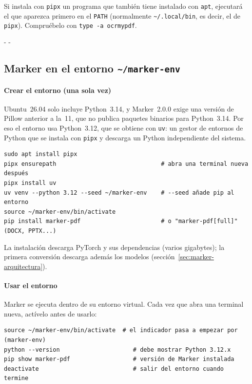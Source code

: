 \documentclass[11pt,a4paper]{article}
\makeatletter
\newcommand{\necesitaespacio}[1]{\par\penalty-100\begingroup
	\setlength{\dimen@}{#1}\dimen@ii\pagegoal\advance\dimen@ii-\pagetotal
	\ifdim\dimen@>\dimen@ii\ifdim\dimen@ii>\z@\vfil\fi\penalty-\@M\fi\endgroup}
\newcommand{\cmd}[1]{\texttt{\textcolor{colcmd}{#1}}}      %
\newcommand{\arch}[1]{\texttt{\textcolor{colarch}{#1}}}    %
\newcommand{\tl}{\textasciitilde{}}  %
\makeatother
\begin{document}
	\begin{advertencia}
		Si instala con \cmd{pipx} un programa que también tiene instalado con \cmd{apt}, ejecutará el que aparezca primero en el \texttt{PATH} (normalmente \arch{\tl/.local/bin}, es decir, el de \cmd{pipx}). Compruébelo con \cmd{type -a ocrmypdf}.
	\end{advertencia}
	
	\necesitaespacio{8\baselineskip}
	\subsection{Marker en el entorno \texttt{\textasciitilde/marker-env}}\label{sec:marker-instalacion}
	
	\paragraph{Crear el entorno (una sola vez)} Ubuntu~26.04 solo incluye Python~3.14, y Marker~2.0.0 exige una versión de Pillow anterior a la~11, que no publica paquetes binarios para Python~3.14. Por eso el entorno usa Python~3.12, que se obtiene con \cmd{uv}: un gestor de entornos de Python que se instala con \cmd{pipx} y descarga un Python independiente del sistema.
	
	\begin{lstlisting}
sudo apt install pipx
pipx ensurepath                              # abra una terminal nueva después
pipx install uv
uv venv --python 3.12 --seed ~/marker-env    # --seed añade pip al entorno
source ~/marker-env/bin/activate
pip install marker-pdf                       # o "marker-pdf[full]" (DOCX, PPTX...)
\end{lstlisting}
	
	La instalación descarga PyTorch y sus dependencias (varios gigabytes); la primera conversión descarga además los modelos (sección~\ref{sec:marker-arquitectura}).
	
	\paragraph{Usar el entorno} Marker se ejecuta dentro de su entorno virtual. Cada vez que abra una terminal nueva, actívelo antes de usarlo:
	
	\begin{lstlisting}
source ~/marker-env/bin/activate  # el indicador pasa a empezar por (marker-env)
python --version                     # debe mostrar Python 3.12.x
pip show marker-pdf                  # versión de Marker instalada
deactivate                           # salir del entorno cuando termine
\end{lstlisting}
	
\end{document}
